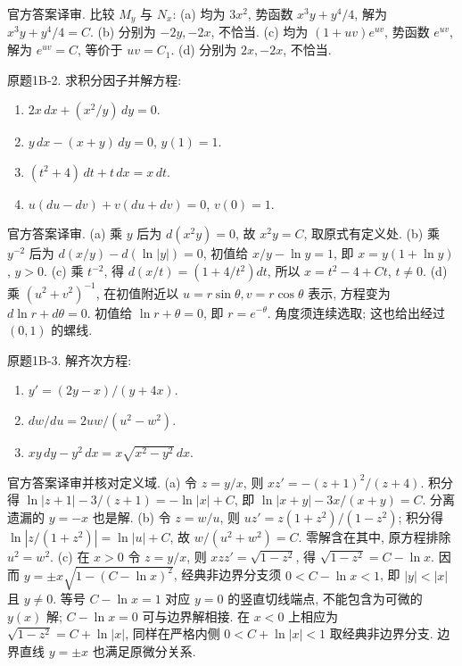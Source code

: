 \begin{solution}
官方答案译审. 比较 $M_y$ 与 $N_x$: (a) 均为 $3x^2$, 势函数 $x^3y+y^4/4$, 解为 $x^3y+y^4/4=C$. (b) 分别为 $-2y,-2x$, 不恰当. (c) 均为 $(1+uv)e^{uv}$, 势函数 $e^{uv}$, 解为 $e^{uv}=C$, 等价于 $uv=C_1$. (d) 分别为 $2x,-2x$, 不恰当.
\end{solution}
\begin{exercise}\label{cw:bank-1B-2}
原题1B-2. 求积分因子并解方程:
\begin{enumerate}[label=\alph*)]
\item $2x\,dx+(x^2/y)\,dy=0$.
\item $y\,dx-(x+y)\,dy=0$, $y(1)=1$.
\item $(t^2+4)\,dt+t\,dx=x\,dt$.
\item $u(du-dv)+v(du+dv)=0$, $v(0)=1$.
\end{enumerate}
\end{exercise}
\begin{solution}
官方答案译审. (a) 乘 $y$ 后为 $d(x^2y)=0$, 故 $x^2y=C$, 取原式有定义处. (b) 乘 $y^{-2}$ 后为 $d(x/y)-d(\ln|y|)=0$, 初值给 $x/y-\ln y=1$, 即 $x=y(1+\ln y)$, $y>0$. (c) 乘 $t^{-2}$, 得 $d(x/t)=(1+4/t^2)dt$, 所以 $x=t^2-4+Ct$, $t\ne0$. (d) 乘 $(u^2+v^2)^{-1}$, 在初值附近以 $u=r\sin\theta,v=r\cos\theta$ 表示, 方程变为 $d\ln r+d\theta=0$. 初值给 $\ln r+\theta=0$, 即 $r=e^{-\theta}$. 角度须连续选取; 这也给出经过 $(0,1)$ 的螺线.
\end{solution}
\begin{exercise}\label{cw:bank-1B-3}
原题1B-3. 解齐次方程:
\begin{enumerate}[label=\alph*)]
\item $y'=(2y-x)/(y+4x)$.
\item $dw/du=2uw/(u^2-w^2)$.
\item $xy\,dy-y^2\,dx=x\sqrt{x^2-y^2}\,dx$.
\end{enumerate}
\end{exercise}
\begin{solution}
官方答案译审并核对定义域. (a) 令 $z=y/x$, 则 $xz'=-(z+1)^2/(z+4)$. 积分得 $\ln|z+1|-3/(z+1)=-\ln|x|+C$, 即 $\ln|x+y|-3x/(x+y)=C$. 分离遗漏的 $y=-x$ 也是解. (b) 令 $z=w/u$, 则 $uz'=z(1+z^2)/(1-z^2)$; 积分得 $\ln|z/(1+z^2)|=\ln|u|+C$, 故 $w/(u^2+w^2)=C$. 零解含在其中, 原方程排除 $u^2=w^2$. (c) 在 $x>0$ 令 $z=y/x$, 则 $xz z'=\sqrt{1-z^2}$, 得 $\sqrt{1-z^2}=C-\ln x$. 因而 $y=\pm x\sqrt{1-(C-\ln x)^2}$, 经典非边界分支须 $0<C-\ln x<1$, 即 $|y|<|x|$ 且 $y\ne0$. 等号 $C-\ln x=1$ 对应 $y=0$ 的竖直切线端点, 不能包含为可微的 $y(x)$ 解; $C-\ln x=0$ 可与边界解相接. 在 $x<0$ 上相应为 $\sqrt{1-z^2}=C+\ln|x|$, 同样在严格内侧 $0<C+\ln|x|<1$ 取经典非边界分支. 边界直线 $y=\pm x$ 也满足原微分关系.
\end{solution}
